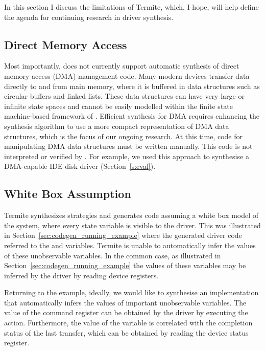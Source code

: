 In this section I discuss the limitations of Termite, which, I hope, will help define the agenda for continuing research in driver synthesis.

\subsection{Direct Memory Access}

Most importantly, \termite does not currently support automatic synthesis of direct memory access (DMA) management code.  Many modern devices transfer data directly to and from main memory, where it is buffered in data structures such as circular buffers and linked lists.  These data structures can have very large or infinite state spaces and cannot be easily modelled within the finite state machine-based framework of \termite.  Efficient synthesis for DMA requires enhancing the synthesis algorithm to use a more compact representation of DMA data structures, which is the focus of our ongoing research.  At this time, code for manipulating DMA data structures must be written manually.  This code is not interpreted or verified by \termite.  For example, we used this approach to synthesise a DMA-capable IDE disk driver (Section~\ref{s:eval}).

\subsection{White Box Assumption}
\label{sec:lim_white_box}

Termite synthesizes strategies and generates code assuming a white box model of the system, where every state variable is visible to the driver. This was illustrated in Section~\ref{sec:codegen_running_example} where the generated driver code referred to the  and  variables. Termite is unable to automatically infer the values of these unobservable variables. In the common case, as illustrated in Section~\ref{sec:codegen_running_example} the values of these variables may be inferred by the driver by reading device registers.

Returning to the example, ideally, we would like to synthesise an implementation that automatically infers the values of important unobservable variables. The value of the command register can be obtained by the driver by executing the  action.  Furthermore, the value of the  variable is correlated with the completion status of the last transfer, which can be obtained by reading the device status register.

